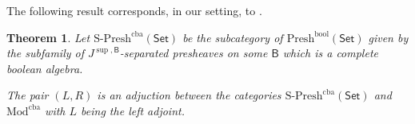 \documentclass[11pt]{amsart}
\newcommand{\Mod}{\textrm{Mod}}
\newcommand{\Presh}{\textrm{Presh}}
\newcommand{\SPresh}{\textrm{S-Presh}}
\newcommand{\modx}{\Mod^{\textrm{bool}}}
\newcommand{\modxx}{\Mod^{\textrm{cba}}}
\theoremstyle{plain}
\newtheorem{theorem}{Theorem}[section]
\theoremstyle{definition}
\theoremstyle{plain}
\theoremstyle{remark}
\newcommand{\dSet}{\mathsf{Set}}
\newcommand{\bool}[1]{\mathsf{#1}}
\newcommand{\cp}[1]{\left( #1 \right)}
\newcommand{\0}{\mathsf{0}}
\renewcommand{\1}{\mathsf{1}}
\renewcommand{\2}{\mathsf{2}}
\theoremstyle{definition}
\begin{document}
The following result corresponds, in our setting, to \cite[Proposition 2.3]{MONROBIS}.
\begin{theorem}\label{thm:adjbvmodpresh}
Let $\SPresh^{\textrm{cba}}(\dSet)$ be the subcategory of $\Presh^{\textrm{bool}}(\dSet)$ given by the subfamily of $J^{\mathrm{\sup},\bool{B}}$-separated presheaves on some $\bool{B}$ which is a complete boolean algebra.

The pair $\cp{L, R}$ is an adjuction between the categories
$\SPresh^{\textrm{cba}}(\dSet)$ and $\modxx$ with $L$ being the 
left adjoint.
\end{theorem}
\end{document}
